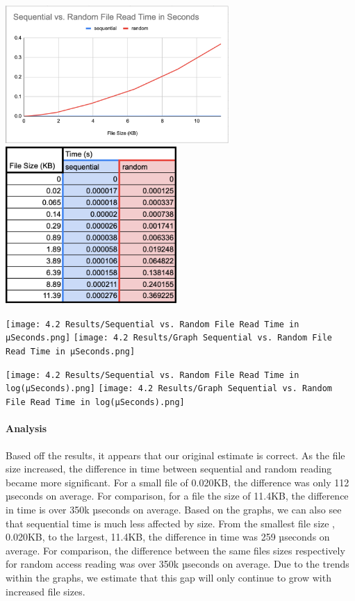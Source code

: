 \includegraphics[width=8.5cm]{4.2 Results/Sequential vs. Random File Read Time in Seconds.png}
\hspace{.5cm}
\includegraphics[width=6.5cm]{4.2 Results/Graph Sequential vs. Random File Read Time in Second.png}

\hspace{.25cm}

\texttt{[image: 4.2 Results/Sequential vs. Random File Read Time in µSeconds.png]}
\hspace{.5cm}
\texttt{[image: 4.2 Results/Graph Sequential vs. Random File Read Time in µSeconds.png]}

\hspace{.25cm}

\texttt{[image: 4.2 Results/Sequential vs. Random File Read Time in log(µSeconds).png]}
\hspace{.5cm}
\texttt{[image: 4.2 Results/Graph Sequential vs. Random File Read Time in log(µSeconds).png]}

\paragraph{Analysis}

Based off the results, it appears that our original estimate is correct. As the file size increased, the difference in time between sequential and random reading became more significant. For a small file of 0.020KB, the difference was only 112 µseconds on average. For comparison, for a file the size of 11.4KB, the difference in time is over 350k µseconds on average. Based on the graphs, we can also see that sequential time is much less affected by size. From the smallest file size , 0.020KB, to the largest, 11.4KB, the difference in time was 259 µseconds on average. For comparison, the difference between the same files sizes respectively for random access reading was over 350k µseconds on average. Due to the trends within the graphs, we estimate that this gap will only continue to grow with increased file sizes.

